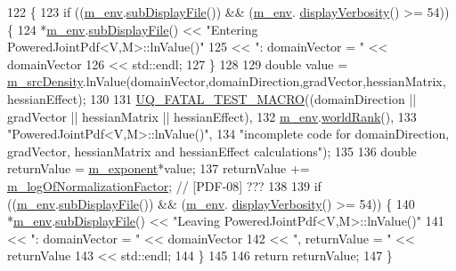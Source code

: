 \begin{DoxyCode}
122 \{
123   \textcolor{keywordflow}{if} ((\hyperlink{class_q_u_e_s_o_1_1_base_scalar_function_adf44141aeb765d97613286f88f235f04}{m\_env}.\hyperlink{class_q_u_e_s_o_1_1_base_environment_a8a0064746ae8dddfece4229b9ad374d6}{subDisplayFile}()) && (\hyperlink{class_q_u_e_s_o_1_1_base_scalar_function_adf44141aeb765d97613286f88f235f04}{m\_env}.
      \hyperlink{class_q_u_e_s_o_1_1_base_environment_a1fe5f244fc0316a0ab3e37463f108b96}{displayVerbosity}() >= 54)) \{
124     *\hyperlink{class_q_u_e_s_o_1_1_base_scalar_function_adf44141aeb765d97613286f88f235f04}{m\_env}.\hyperlink{class_q_u_e_s_o_1_1_base_environment_a8a0064746ae8dddfece4229b9ad374d6}{subDisplayFile}() << \textcolor{stringliteral}{"Entering PoweredJointPdf<V,M>::lnValue()"}
125                             << \textcolor{stringliteral}{": domainVector = "} << domainVector
126                             << std::endl;
127   \}
128 
129   \textcolor{keywordtype}{double} value = \hyperlink{class_q_u_e_s_o_1_1_powered_joint_pdf_a80cd4ecb6f5dc0e1f61d0317ef07a616}{m\_srcDensity}.lnValue(domainVector,domainDirection,gradVector,hessianMatrix,
      hessianEffect);
130 
131   \hyperlink{_defines_8h_a56d63d18d0a6d45757de47fcc06f574d}{UQ\_FATAL\_TEST\_MACRO}((domainDirection || gradVector || hessianMatrix || hessianEffect),
132                       \hyperlink{class_q_u_e_s_o_1_1_base_scalar_function_adf44141aeb765d97613286f88f235f04}{m\_env}.\hyperlink{class_q_u_e_s_o_1_1_base_environment_a78b57112bbd0e6dd0e8afec00b40ffa7}{worldRank}(),
133                       \textcolor{stringliteral}{"PoweredJointPdf<V,M>::lnValue()"},
134                       \textcolor{stringliteral}{"incomplete code for domainDirection, gradVector, hessianMatrix and hessianEffect
       calculations"});
135 
136   \textcolor{keywordtype}{double} returnValue = \hyperlink{class_q_u_e_s_o_1_1_powered_joint_pdf_a867f4a159b1bf2419ef049507306ce79}{m\_exponent}*value;
137   returnValue += \hyperlink{class_q_u_e_s_o_1_1_base_joint_pdf_ae82d4191f17af8c7a26226d127bc7850}{m\_logOfNormalizationFactor}; \textcolor{comment}{// [PDF-08] ???}
138 
139   \textcolor{keywordflow}{if} ((\hyperlink{class_q_u_e_s_o_1_1_base_scalar_function_adf44141aeb765d97613286f88f235f04}{m\_env}.\hyperlink{class_q_u_e_s_o_1_1_base_environment_a8a0064746ae8dddfece4229b9ad374d6}{subDisplayFile}()) && (\hyperlink{class_q_u_e_s_o_1_1_base_scalar_function_adf44141aeb765d97613286f88f235f04}{m\_env}.
      \hyperlink{class_q_u_e_s_o_1_1_base_environment_a1fe5f244fc0316a0ab3e37463f108b96}{displayVerbosity}() >= 54)) \{
140     *\hyperlink{class_q_u_e_s_o_1_1_base_scalar_function_adf44141aeb765d97613286f88f235f04}{m\_env}.\hyperlink{class_q_u_e_s_o_1_1_base_environment_a8a0064746ae8dddfece4229b9ad374d6}{subDisplayFile}() << \textcolor{stringliteral}{"Leaving PoweredJointPdf<V,M>::lnValue()"}
141                             << \textcolor{stringliteral}{": domainVector = "} << domainVector
142                             << \textcolor{stringliteral}{", returnValue = "}  << returnValue
143                             << std::endl;
144   \}
145 
146   \textcolor{keywordflow}{return} returnValue;
147 \}
\end{DoxyCode}
